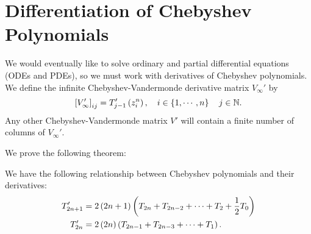\section{Differentiation of Chebyshev Polynomials}
\label{sec:CV_diff}

We would eventually like to solve ordinary and partial differential equations
(ODEs and PDEs), so we must work with derivatives of Chebyshev polynomials.
We define the infinite Chebyshev-Vandermonde derivative matrix
$V_{\infty}'$ by
%
\begin{equation}
\left[ V_{\infty}' \right]_{ij}
    = T_{j-1}'\left( z_{i}^{n} \right),\quad i\in\left\{ 1,\cdots,n \right\}
\quad j\in\mathbb{N}.
\end{equation}
%
Any other Chebyshev-Vandermonde matrix $V'$ will contain
a finite number of columns of $V_{\infty}'$. 

We prove the following theorem:

\begin{thm}
We have the following relationship between Chebyshev polynomials
and their derivatives:
%
\begin{align}
    T_{2n+1}' &= 2\left( 2n+1 \right)\left( T_{2n} + T_{2n-2} + \cdots + T_{2} +
                    \frac{1}{2}T_{0} \right) \nonumber\\
    T_{2n}' &= 2\left( 2n \right)\left( T_{2n-1} + T_{2n-3} + \cdots + T_{1} \right).
\end{align}
\end{thm}

